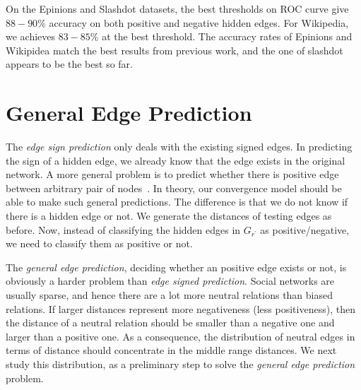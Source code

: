 On the Epinions and Slashdot datasets, the best thresholds on ROC
curve give $88-90 \%$ accuracy on both positive and negative
hidden edges. For Wikipedia, we achieves $83-85 \%$ at the best
threshold. The accuracy rates of Epinions and Wikipidea match the best
results from previous work, and the one of slashdot appears to be the
best so far.
\section{General Edge Prediction}
The {\it edge sign prediction} only
deals with the existing signed edges. In predicting the sign of a
hidden edge, we already know that the edge exists in the original
network. A more general problem is to predict whether there is positive edge between arbitrary pair of nodes~\cite{Kleinberg:03}. In theory, our convergence model should
be able to make such general predictions. The difference is that we do
not know if there is a hidden edge or not. We generate the distances of
testing edges as before. Now, instead of classifying the hidden edges
in $G_{r^{'}}$ as positive/negative, we need to classify them as positive or not.

The {\it general edge prediction}, deciding whether an positive edge exists or
not, is obviously a harder problem than {\it edge signed
  prediction}. Social networks are usually sparse, and hence there are
a lot more neutral relations than biased relations. If larger
distances represent more negativeness (less positiveness), then the
distance of a neutral relation should be smaller than a negative one
and larger than a positive one. As a consequence, the distribution of
neutral edges in terms of distance should concentrate in the middle
range distances. We next study this distribution, as a preliminary
step to solve the {\it general edge prediction} problem.

